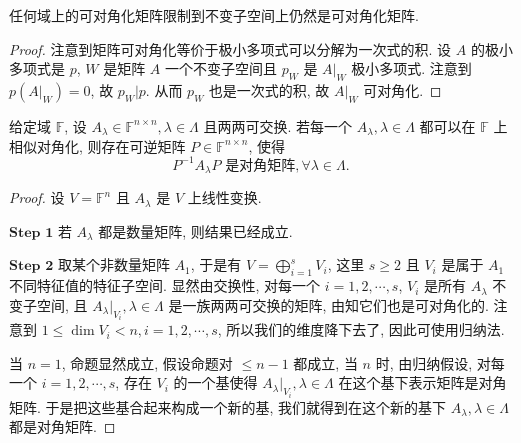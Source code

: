 \documentclass[../../main.tex]{subfiles}%
\begin{document}
\begin{lemma}\label{lemma:可对角化矩阵限制后仍可对角化}
任何域上的可对角化矩阵限制到不变子空间上仍然是可对角化矩阵.
\end{lemma}
\begin{proof}
注意到矩阵可对角化等价于极小多项式可以分解为一次式的积. 设 \( A \) 的极小多项式是 \( p \), \( W \) 是矩阵 \( A \) 一个不变子空间且 \( p_W \) 是 \( A|_W \) 极小多项式. 注意到 \( p(A|_W) = 0 \), 故 \( p_W | p \). 从而 \( p_W \) 也是一次式的积, 故 \( A|_W \) 可对角化.
\end{proof}

\begin{proposition}[一族两两可交换的可对角化矩阵可同时相似对角化]\label{proposition:一族两两可交换的可对角化矩阵可同时相似对角化}
给定域 \( \mathbb{F} \), 设 \( A_\lambda \in \mathbb{F}^{n \times n}, \lambda \in \Lambda \) 且两两可交换. 若每一个 \( A_\lambda, \lambda \in \Lambda \) 都可以在 \( \mathbb{F} \) 上相似对角化, 则存在可逆矩阵 \( P \in \mathbb{F}^{n \times n} \), 使得
\[
P^{-1}A_\lambda P \text{ 是对角矩阵}, \forall \lambda \in \Lambda.
\]
\end{proposition}
\begin{proof}
设 \( V = \mathbb{F}^n \) 且 \( A_\lambda \) 是 \( V \) 上线性变换.

$\mathbf{Step}\,\,\mathbf{1}$  若 \( A_\lambda \) 都是数量矩阵, 则结果已经成立.

$\mathbf{Step}\,\,\mathbf{2}$  取某个非数量矩阵 \( A_1 \), 于是有 \( V = \bigoplus_{i=1}^s V_i \), 这里 \( s \geqslant  2 \) 且 \( V_i \) 是属于 \( A_1 \) 不同特征值的特征子空间. 显然由交换性, 对每一个 \( i = 1,2,\cdots,s \), \( V_i \) 是所有 \( A_\lambda \) 不变子空间, 且 \( A_\lambda|_{V_i}, \lambda \in \Lambda \) 是一族两两可交换的矩阵, 由知它们也是可对角化的. 注意到 \( 1 \leqslant  \dim V_i < n, i = 1,2,\cdots,s \), 所以我们的维度降下去了, 因此可使用归纳法.

当 \( n = 1 \), 命题显然成立, 假设命题对 \( \leqslant  n - 1 \) 都成立, 当 \( n \) 时, 由归纳假设, 对每一个 \( i = 1,2,\cdots,s \), 存在 \( V_i \) 的一个基使得 \( A_\lambda|_{V_i}, \lambda \in \Lambda \) 在这个基下表示矩阵是对角矩阵. 于是把这些基合起来构成一个新的基, 我们就得到在这个新的基下 \( A_\lambda, \lambda \in \Lambda \) 都是对角矩阵.
\end{proof}
\end{document}
